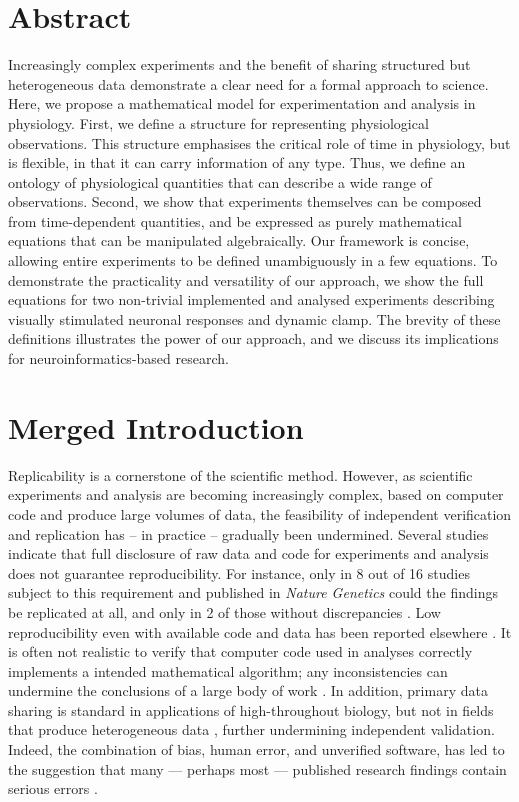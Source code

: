 
\section*{Abstract}

Increasingly complex experiments and the benefit of sharing structured
but heterogeneous data demonstrate a clear need for a formal approach
to science.  Here, we propose a mathematical model for
experimentation and analysis in physiology. First, we define a
structure for representing physiological observations. This structure
emphasises the critical role of time in physiology, but is flexible,
in that it can carry information of any type. Thus, we define an
ontology of physiological quantities that can describe a wide range of
observations. Second, we show that experiments themselves can be
composed from time-dependent quantities, and be expressed as purely
mathematical equations that can be manipulated algebraically. Our
framework is concise, allowing entire experiments to be defined
unambiguously in a few equations. To demonstrate the practicality and
versatility of our approach, we show the full equations for two
non-trivial implemented and analysed experiments describing visually
stimulated neuronal responses and dynamic clamp. The brevity of these
definitions illustrates the power of our approach, and we discuss its
implications for neuroinformatics-based research.

\pagebreak

\section*{Merged Introduction}

Replicability is a cornerstone of the scientific method. However, as
scientific experiments and analysis are becoming increasingly complex,
based on computer code and produce large volumes of data, the
feasibility of independent verification and replication has -- in
practice -- gradually been undermined. Several studies indicate that
full disclosure of raw data and code for experiments and analysis does
not guarantee reproducibility.  For instance, only in 8 out of 16
studies subject to this requirement and published in \emph{Nature
  Genetics} could the findings be replicated at all, and only in 2 of
those without discrepancies \citep{Ioannidis2008}. Low reproducibility
even with available code and data has been reported elsewhere
\citep{Baggerly2009, McCullough2007}. It is often not realistic to
verify that computer code used in analyses correctly implements a
intended mathematical algorithm; any inconsistencies can undermine the
conclusions of a large body of work \citep{Chang2006}.  In addition,
primary data sharing is standard in applications of high-throughout
biology, but not in fields that produce heterogeneous data
\citep{Gardner2005}, further undermining independent validation.
Indeed, the combination of bias, human error, and unverified software,
has led to the suggestion that many --- perhaps most --- published
research findings contain serious errors \citep{Ioannidis2005,
  Merali2010}.

